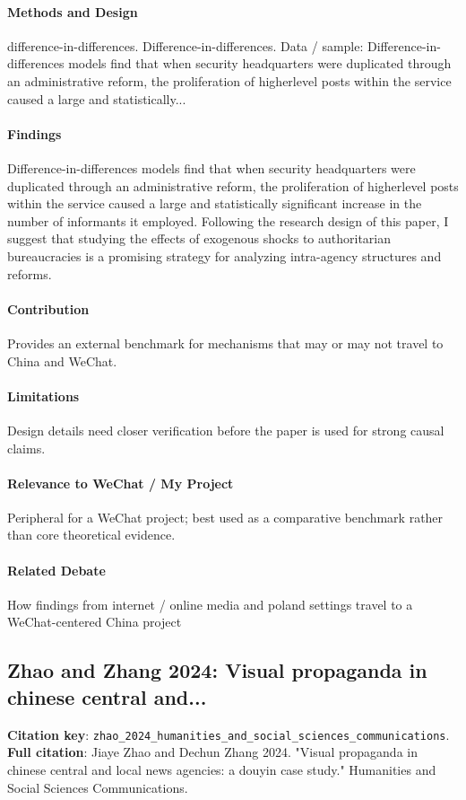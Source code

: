 \documentclass[12pt]{article}
\begin{document}
\paragraph{Methods and Design} difference-in-differences. Difference-in-differences. Data / sample: Difference-in-differences models find that when security headquarters were duplicated through an administrative reform, the proliferation of higherlevel posts within the service caused a large and statistically...

\paragraph{Findings} Difference-in-differences models find that when security headquarters were duplicated through an administrative reform, the proliferation of higherlevel posts within the service caused a large and statistically significant increase in the number of informants it employed. Following the research design of this paper, I suggest that studying the effects of exogenous shocks to authoritarian bureaucracies is a promising strategy for analyzing intra-agency structures and reforms.

\paragraph{Contribution} Provides an external benchmark for mechanisms that may or may not travel to China and WeChat.

\paragraph{Limitations} Design details need closer verification before the paper is used for strong causal claims.

\paragraph{Relevance to WeChat / My Project} Peripheral for a WeChat project; best used as a comparative benchmark rather than core theoretical evidence.

\paragraph{Related Debate} How findings from internet / online media and poland settings travel to a WeChat-centered China project


\subsection{Zhao and Zhang 2024: Visual propaganda in chinese central and...}
\textbf{Citation key}: \texttt{zhao\_2024\_humanities\_and\_social\_sciences\_communications}.\\
\textbf{Full citation}: Jiaye Zhao and Dechun Zhang 2024. "Visual propaganda in chinese central and local news agencies: a douyin case study." Humanities and Social Sciences Communications.
\end{document}
